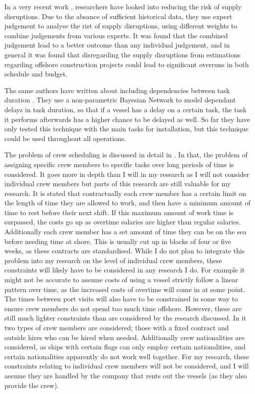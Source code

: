 \documentclass[a4paper,12pt]{article}
\begin{document}
\bigskip

In a very recent work \cite{leontaris2019decision}, researchers have looked into reducing the risk of supply disruptions. Due to the absance of sufficient historical data, they use expert judgement to analyse the rist of supply disruptions, using different weights to combine judgements from various experts. It was found that the combined judgement lead to a better outcome than any individual judgement, and in general it was found that disregarding the supply disruptions from estimations regarding offshore construction projects could lead to significant overruns in both schedule and budget. 

The same authors have written about including dependencies between task duration \cite{leontarisprobabilistic}. They use a non-parametric Bayesian Network to model dependant delays in task duration, so that if a vessel has a delay on a certain task, the task it performs afterwards has a higher chance to be delayed as well. So far they have only tested this technique with the main tasks for installation, but this technique could be used throughout all operations. 

\bigskip

The problem of crew scheduling is discussed in detail in \cite{leggate2010crew}. In that, the problem of assigning specific crew members to specific tasks over long periods of time is considered. It goes more in depth than I will in my research as I will not consider individual crew members but parts of this research are still valuable for my research. It is stated that contractually each crew member has a certain limit on the length of time they are allowed to work, and then have a minimum amount of time to rest before their next shift. If this maximum amount of work time is surpassed, the costs go up as overtime salaries are higher than regular salaries. Additionally each crew member has a set amount of time they can be on the sea before needing time at shore. This is usually cut up in blocks of four or five weeks, as these contracts are standardised. While I do not plan to integrate this problem into my research on the level of individual crew members, these constraints will likely have to be considered in any research I do. For example it might not be accurate to assume costs of using a vessel strictly follow a linear pattern over time, as the increased costs of overtime will come in at some point. The times between port visits will also have to be constrained in some way to ensure crew members do not spend too much time offshore. However, these are still much lighter constraints than are considered by the research discussed. In it two types of crew members are considered; those with a fixed contract and outside hires who can be hired when needed. Additionally crew nationalities are considered, as ships with certain flags can only employ certain nationalities, and certain nationalities apparently do not work well together. For my research, these constraints relating to individual crew members will not be considered, and I will assume they are handled by the company that rents out the vessels (as they also provide the crew). 
\end{document}
